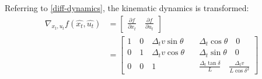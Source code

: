 \documentclass{article}
\begin{document}
Referring to \eqref{diff-dynamics}, the kinematic dynamics is transformed:\\
\begin{equation}
\begin{aligned}
    \nabla_{x_t, u_t} f(\hat{x_t}, \hat{u_t}) & = \begin{bmatrix}
        \frac{\partial{f}}{\partial{x_t}} \quad \frac{\partial{f}}{\partial{u_t}}
    \end{bmatrix}\\
    & = \begin{bmatrix}
        1 \quad 0 \quad \Delta_t v \sin{\theta} \quad & \Delta_t \cos{\theta} \quad 0 \\
        0 \quad 1 \quad \Delta_t v \cos{\theta} \quad & \Delta_t \sin{\theta} \quad 0 \\
        0 \quad 0 \quad            1            \quad & \frac{\Delta_t \tan{\delta}}{L} \quad \frac{\Delta_t v}{L\cos{\delta}^2}
    \end{bmatrix}
\end{aligned}
\end{equation}
\end{document}
